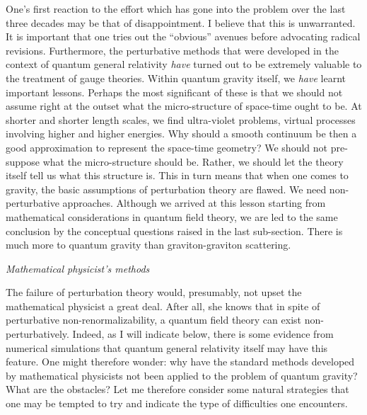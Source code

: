 One's first reaction to the effort which has gone into the problem over
the last three decades may be that of disappointment. I believe that this
is unwarranted. It is important that one tries out the ``obvious''
avenues before advocating radical revisions. Furthermore, the perturbative
methods that were developed in the context of quantum general relativity
{\it have} turned out to be extremely valuable to the treatment of gauge
theories. Within quantum gravity itself, we {\it have} learnt important
lessons. Perhaps the
most significant of these is that we should not assume right at the outset
what the micro-structure of space-time ought to be. At shorter and shorter
length scales, we find ultra-violet problems, virtual processes involving
higher and higher energies. Why should a smooth continuum be then a good
approximation to represent the space-time geometry? We should not pre-suppose
what the micro-structure should be. Rather, we should let the theory itself
tell us what this structure is. This in turn means that when one comes to
gravity, the basic assumptions of perturbation theory are flawed. We need
non-perturbative approaches. Although we arrived at this lesson starting
from mathematical considerations in quantum field theory, we are led to
the same conclusion by the conceptual questions raised in the last sub-section.
There is much more to quantum gravity than graviton-graviton scattering.
\medskip
\goodbreak

{\sl Mathematical physicist's methods}

The failure of perturbation theory would, presumably, not upset the
mathematical physicist a great deal. After all, she knows that in spite of
perturbative non-renorma\-liza\-bility, a quantum field theory can exist
non-perturbatively. Indeed, as I will indicate below, there is some evidence
from numerical simulations that quantum general relativity itself may have
this feature. One might therefore wonder: why have the standard methods
developed by mathematical physicists not been applied to the problem of
quantum gravity? What are the obstacles? Let me therefore consider some
natural strategies that one may be tempted to try and indicate the type of
difficulties one encounters.

